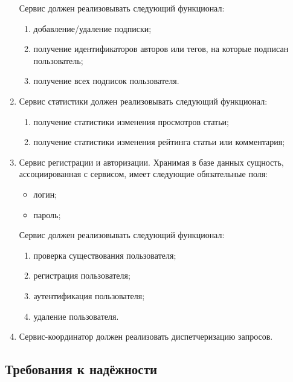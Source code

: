 \documentclass{bmstu-gost-7-32}
\begin{document}
\begin{enumerate}
\begin{itemize}
	\end{itemize}
	Сервис должен реализовывать следующий функционал:
	\begin{enumerate}
		\item добавление/удаление подписки;
		\item получение идентификаторов авторов или тегов, на которые подписан пользователь;
		\item получение всех подписок пользователя.
	\end{enumerate}
	\item Сервис статистики должен реализовывать следующий функционал:
	\begin{enumerate}
		\item получение статистики изменения просмотров статьи;
		\item получение статистики изменения рейтинга статьи или комментария;
	\end{enumerate}
	\item Сервис регистрации и авторизации.
	Хранимая в базе данных сущность, ассоциированная с сервисом, имеет следующие обязательные поля:
	\begin{itemize}
		\item логин;
		\item пароль;
	\end{itemize}
	Сервис должен реализовывать следующий функционал:
	\begin{enumerate}
		\item проверка существования пользователя;
		\item регистрация пользователя;
		\item аутентификация пользователя;
		\item удаление пользователя.
	\end{enumerate}
	\item Сервис-координатор должен реализовать диспетчеризацию запросов.
\end{enumerate}

\subsection{Требования к надёжности}


\end{document}
